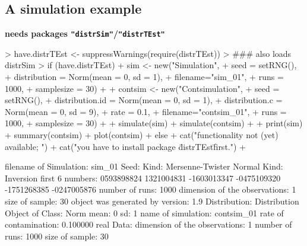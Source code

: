 \documentclass[11pt]{article}
\newcommand{\pkg}[1]{{\tt "#1"}}
\begin{document}
\subsection{A simulation example}\label{simex}
{\bf needs packages \pkg{distrSim}/\pkg{distrTEst}}\\[2ex]
\begin{Schunk}
\begin{Sinput}
> have.distrTEst <- suppressWarnings(require(distrTEst))
>     ### also loads distrSim
> if (have.distrTEst)
+    { sim <- new("Simulation",
+                 seed = setRNG(),
+                 distribution = Norm(mean = 0, sd = 1),
+                 filename="sim_01",
+                 runs = 1000,
+                 samplesize = 30)
+
+      contsim <- new("Contsimulation",
+                     seed = setRNG(),
+                     distribution.id = Norm(mean = 0, sd = 1),
+                     distribution.c = Norm(mean = 0, sd = 9),
+                     rate = 0.1,
+                     filename="contsim_01",
+                     runs = 1000,
+                     samplesize = 30)
+
+      simulate(sim)
+      simulate(contsim)
+
+      print(sim)
+      summary(contsim)
+      plot(contsim)
+    } else {
+     cat("\n functionality not (yet) available; ")
+     cat("you have to install package \"distrTEst\" first.\n")
+    }
\end{Sinput}
\begin{Soutput}
filename of Simulation: sim_01
Seed:  Kind: Mersenne-Twister
       Normal Kind: Inversion
       first 6 numbers:  0593898824  1321004831 -1603013347
                        -0475109320 -1751268385 -0247005876
number of runs: 1000
dimension of the observations: 1
size of sample: 30
object was generated by version: 1.9
Distribution:
Distribution Object of Class: Norm
 mean: 0
 sd: 1
name of simulation: contsim_01
rate of contamination: 0.100000
real Data:
dimension of the observations: 1
number of runs: 1000
size of sample: 30
\end{Soutput}
\end{Schunk}
\end{document}
